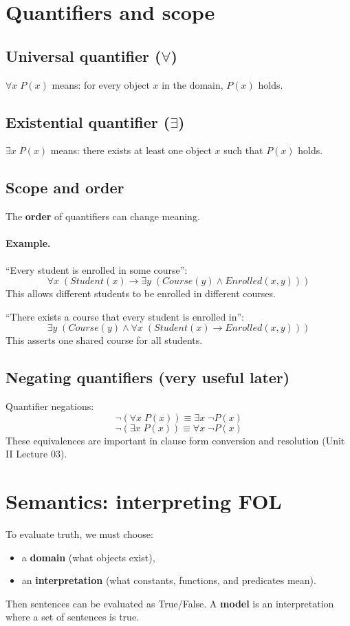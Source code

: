 \documentclass[11pt]{article}
\begin{document}
\section{Quantifiers and scope}
\subsection{Universal quantifier ($\forall$)}
$\forall x\; P(x)$ means: for every object $x$ in the domain, $P(x)$ holds.

\subsection{Existential quantifier ($\exists$)}
$\exists x\; P(x)$ means: there exists at least one object $x$ such that $P(x)$ holds.

\subsection{Scope and order}
The \textbf{order} of quantifiers can change meaning.

\paragraph{Example.}
``Every student is enrolled in some course'':
\[
  \forall x\; (Student(x) \rightarrow \exists y\; (Course(y) \land Enrolled(x,y)))
\]
This allows different students to be enrolled in different courses.

``There exists a course that every student is enrolled in'':
\[
  \exists y\; (Course(y) \land \forall x\; (Student(x) \rightarrow Enrolled(x,y)))
\]
This asserts one shared course for all students.

\subsection{Negating quantifiers (very useful later)}
Quantifier negations:
\[
  \lnot(\forall x\; P(x)) \equiv \exists x\; \lnot P(x)
\]
\[
  \lnot(\exists x\; P(x)) \equiv \forall x\; \lnot P(x)
\]
These equivalences are important in clause form conversion and resolution (Unit II Lecture 03).

\section{Semantics: interpreting FOL}
To evaluate truth, we must choose:
\begin{itemize}[leftmargin=*]
  \item a \textbf{domain} (what objects exist),
  \item an \textbf{interpretation} (what constants, functions, and predicates mean).
\end{itemize}
Then sentences can be evaluated as True/False. A \textbf{model} is an interpretation where a set of sentences is true.
\end{document}

